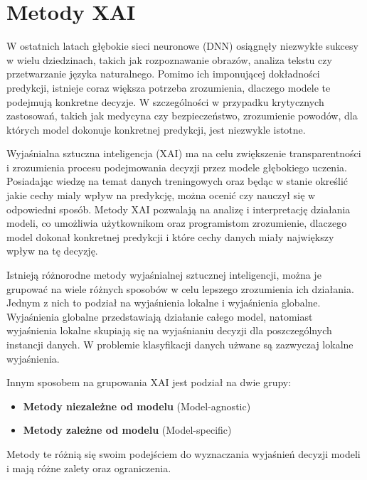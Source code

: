
\section*{Metody XAI}
W ostatnich latach głębokie sieci neuronowe (DNN) osiągnęły niezwykłe sukcesy w wielu dziedzinach, takich jak rozpoznawanie obrazów, analiza tekstu czy przetwarzanie języka naturalnego.
Pomimo ich imponującej dokładności predykcji, istnieje coraz większa potrzeba zrozumienia, dlaczego modele te podejmują konkretne decyzje.
W szczególności w przypadku krytycznych zastosowań, takich jak medycyna czy bezpieczeństwo, zrozumienie powodów, dla których model dokonuje konkretnej predykcji, jest niezwykle istotne.

Wyjaśnialna sztuczna inteligencja (XAI)\cite{XAItax, XAIcurrent, XAIOnC, XAIcounter} ma na celu zwiększenie transparentności i zrozumienia procesu podejmowania decyzji przez modele głębokiego uczenia.
Posiadając wiedzę na temat danych treningowych oraz będąc w stanie określić jakie cechy mialy wpływ na predykcję, można ocenić czy nauczył się w odpowiedni sposób.
Metody XAI pozwalają na analizę i interpretację działania modeli, co umożliwia użytkownikom oraz programistom zrozumienie, dlaczego model dokonał konkretnej predykcji i które cechy danych miały największy wpływ na tę decyzję.

Istnieją różnorodne metody wyjaśnialnej sztucznej inteligencji, można je grupować na wiele różnych sposobów w celu lepszego zrozumienia ich działania.
Jednym z nich to podział na wyjaśnienia lokalne\cite{ribeiro2016why} i wyjaśnienia globalne\cite{XAIglobal}.
Wyjaśnienia globalne przedstawiają działanie całego model, natomiast wyjaśnienia lokalne skupiają się na wyjaśnianiu decyzji dla poszczególnych instancji danych.
W problemie klasyfikacji danych użwane są zazwyczaj lokalne wyjaśnienia.

Innym sposobem na grupowania XAI jest podział na dwie grupy:
\begin{itemize}
	\item \textbf{Metody niezależne od modelu} (Model-agnostic)
	\item \textbf{Metody zależne od modelu} (Model-specific)
\end{itemize}
Metody te różnią się swoim podejściem do wyznaczania wyjaśnień decyzji modeli i mają różne zalety oraz ograniczenia.

